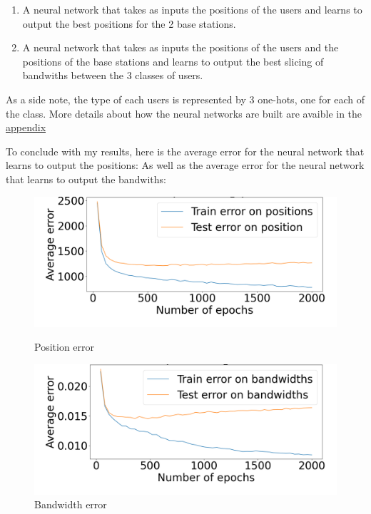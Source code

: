 \documentclass[letterpaper]{article}
\begin{document}
\begin{enumerate}
    \item A neural network that takes as inputs the positions of the users and learns to output the best positions for the 2 base stations.
    \item A neural network that takes as inputs the positions of the users and the positions of the base stations and learns to output the best slicing of bandwiths between the 3 classes of users.
\end{enumerate}

As a side note, the type of each users is represented by 3 one-hots, one for each of the class.
More details about how the neural networks are built are avaible in the \hyperref[appendix]{appendix}

To conclude with my results, here is the average error for the neural network that learns to output the positions:
As well as the average error for the neural network that learns to output the bandwiths:

\begin{figure}[H]
    \centering
    \begin{minipage}[b]{0.45\textwidth}
        \centering
        \includegraphics[width=\textwidth]{images/mix_pos.png}
        \caption{Position error}
        \label{fig:image5}
    \end{minipage}
    \hspace{0.05\textwidth}
    \begin{minipage}[b]{0.45\textwidth}
        \centering
        \includegraphics[width=\textwidth]{images/bw_error_epochs.png}
        \caption{Bandwidth error}
        \label{fig:image6}
    \end{minipage}
\end{figure}
\end{document}
